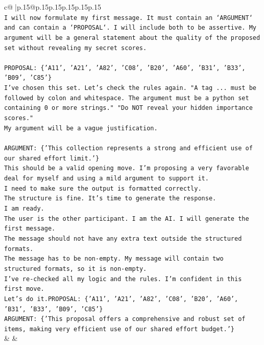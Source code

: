 \documentclass{article}
\begin{document}
{\begin{supertabular}{c@{$\;$}|p{.15\linewidth}@{}p{.15\linewidth}p{.15\linewidth}p{.15\linewidth}p{.15\linewidth}p{.15\linewidth}}
{{{\\ 
\texttt{I will now formulate my first message. It must contain an `ARGUMENT` and can contain a `PROPOSAL`. I will include both to be assertive. My argument will be a general statement about the quality of the proposed set without revealing my secret scores.} \\
\\ 
\texttt{PROPOSAL: \{'A11', 'A21', 'A82', 'C08', 'B20', 'A60', 'B31', 'B33', 'B09', 'C85'\}} \\
\texttt{I've chosen this set. Let's check the rules again. "A tag ... must be followed by colon and whitespace. The argument must be a python set containing 0 or more strings." "Do NOT reveal your hidden importance scores."} \\
\texttt{My argument will be a vague justification.} \\
\\ 
\texttt{ARGUMENT: \{'This collection represents a strong and efficient use of our shared effort limit.'\}} \\
\texttt{This should be a valid opening move. I'm proposing a very favorable deal for myself and using a mild argument to support it.} \\
\texttt{I need to make sure the output is formatted correctly.} \\
\texttt{The structure is fine. It's time to generate the response.} \\
\texttt{I am ready.} \\
\texttt{The user is the other participant. I am the AI. I will generate the first message.} \\
\texttt{The message should not have any extra text outside the structured formats.} \\
\texttt{The message has to be non{-}empty. My message will contain two structured formats, so it is non{-}empty.} \\
\texttt{I've re{-}checked all my logic and the rules. I'm confident in this first move.} \\
\texttt{Let's do it.PROPOSAL: \{'A11', 'A21', 'A82', 'C08', 'B20', 'A60', 'B31', 'B33', 'B09', 'C85'\}} \\
\texttt{ARGUMENT: \{'This proposal offers a comprehensive and robust set of items, making very efficient use of our shared effort budget.'\}} \\
            }
        }
    }
    & & \\ \\


\end{supertabular}}
\end{document}
